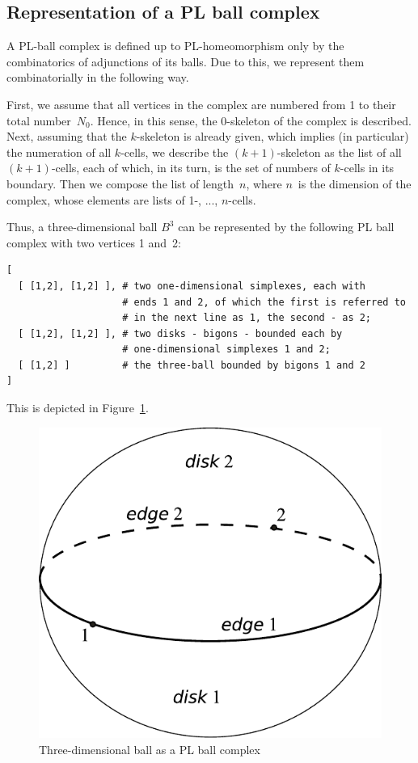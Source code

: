 \documentclass{article}
\begin{document}
\subsection{Representation of a PL ball complex}

A PL-ball complex is defined up to PL-homeomorphism only by the combinatorics of adjunctions of its balls. Due to this, we represent them combinatorially in the following way.

First, we assume that all vertices in the complex are numbered from 1 to their total number~$N_0$. Hence, in this sense, the 0-skeleton of the complex is described. Next, assuming that the $k$-skeleton is already given, which implies (in particular) the numeration of all $k$-cells, we describe the $(k+1)$-skeleton as the list of all $(k+1)$-cells, each of which, in its turn, is the set of numbers of $k$-cells in its boundary. Then we compose the list of length~$n$, where $n$~is the dimension of the complex, whose elements are lists of 1-, ..., $n$-cells.

Thus, a three-dimensional ball $B^3$ can be represented by the following PL ball complex with two vertices 1 and~2:
\begin{verbatim}
[
  [ [1,2], [1,2] ], # two one-dimensional simplexes, each with
                    # ends 1 and 2, of which the first is referred to
                    # in the next line as 1, the second - as 2;
  [ [1,2], [1,2] ], # two disks - bigons - bounded each by
                    # one-dimensional simplexes 1 and 2;
  [ [1,2] ]         # the three-ball bounded by bigons 1 and 2
]
\end{verbatim}
This is depicted in Figure~\ref{fig:B3}.
\begin{figure}
\centering
\includegraphics[scale=.5]{Ris_E_1.pdf}
\caption{Three-dimensional ball as a PL ball complex}
\label{fig:B3}
\end{figure}
\end{document}
